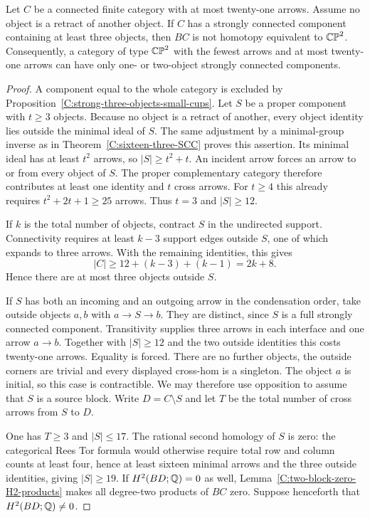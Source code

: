 \begin{proposition}\label{C:large-SCC-minimal-candidate21}
Let $C$ be a connected finite category with at most twenty-one
arrows. Assume no object is a retract of another object.
If $C$ has a strongly connected component containing at least
three objects, then $BC$ is not homotopy equivalent to $\mathbb {CP}^2$.
Consequently, a category of type $\mathbb {CP}^2$ with the fewest arrows
and at most twenty-one arrows can have only one- or two-object
strongly connected components.
\end{proposition}
\begin{proof}
A component equal to the whole category is excluded by
Proposition~\ref{C:strong-three-objects-small-cups}.
Let $S$ be a proper component with $t\geq3$ objects.
Because no object is a retract of another, every object identity
lies outside the minimal ideal of $S$. The same adjustment by a
minimal-group inverse as in
Theorem~\ref{C:sixteen-three-SCC} proves this assertion.
Its minimal ideal has at least $t^2$ arrows, so $|S|\geq t^2+t$.
An incident arrow forces an arrow to or from every object of $S$.
The proper complementary category therefore contributes at least
one identity and $t$ cross arrows. For $t\geq4$ this already
requires $t^2+2t+1\geq25$ arrows. Thus $t=3$ and $|S|\geq12$.

If $k$ is the total number of objects, contract $S$ in the
undirected support. Connectivity requires at least $k-3$ support
edges outside $S$, one of which expands to three arrows. With
the remaining identities, this gives
\[
 |C|\geq12+(k-3)+(k-1)=2k+8.
\]
Hence there are at most three objects outside $S$.

If $S$ has both an incoming and an outgoing arrow in the
condensation order, take outside objects $a,b$ with
$a\to S\to b$. They are distinct, since $S$ is a full strongly
connected component. Transitivity supplies three arrows in each
interface and one arrow $a\to b$. Together with $|S|\geq12$
and the two outside identities this costs twenty-one arrows.
Equality is forced. There are no further objects, the outside
corners are trivial and every displayed cross-hom is a singleton.
The object $a$ is initial, so this case is contractible.
We may therefore use opposition to assume that $S$ is a source
block. Write $D=C\setminus S$ and let $T$ be the total number
of cross arrows from $S$ to $D$.

One has $T\geq3$ and $|S|\leq17$. The rational second homology
of $S$ is zero: the categorical Rees Tor formula would otherwise
require total row and column counts at least four, hence at least
sixteen minimal arrows and the three outside identities, giving
$|S|\geq19$. If $H^2(BD;\mathbb Q)=0$ as well,
Lemma~\ref{C:two-block-zero-H2-products} makes all degree-two
products of $BC$ zero. Suppose henceforth that $H^2(BD;\mathbb Q)\ne0$.


\end{proof}
